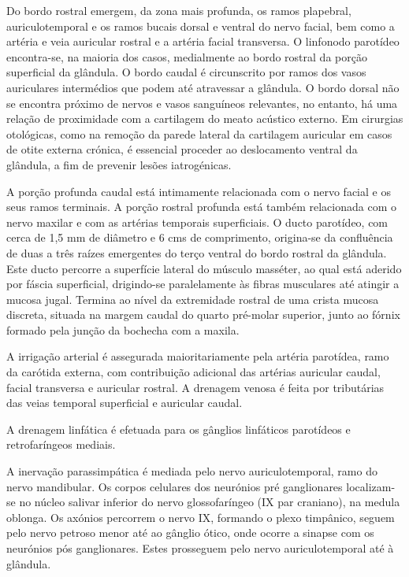 Do bordo rostral emergem, da zona mais profunda, os ramos plapebral, auriculotemporal e os ramos bucais dorsal e ventral do nervo facial, bem como a artéria e veia auricular rostral e a artéria facial transversa.\cite{Singh2017} O linfonodo parotídeo encontra-se, na maioria dos casos, medialmente ao bordo rostral da porção superficial da glândula.\cite{Singh2017} O bordo caudal é circunscrito por ramos dos vasos auriculares intermédios que podem até atravessar a glândula.\cite{Singh2017}
O bordo dorsal não se encontra próximo de nervos e vasos sanguíneos relevantes, no entanto, há uma relação de proximidade com a cartilagem do meato acústico externo.\cite{Singh2017} Em cirurgias otológicas, como na remoção da parede lateral da cartilagem auricular em casos de otite externa crónica, é essencial proceder ao deslocamento ventral da glândula, a fim de prevenir lesões iatrogénicas. \cite{Singh2017}


A porção profunda caudal está intimamente relacionada com o nervo facial e os seus ramos terminais.\cite{Singh2017} A porção rostral profunda está também relacionada com o nervo maxilar e com as artérias temporais superficiais.\cite{Singh2017}
O ducto parotídeo, com cerca de 1,5 mm  de diâmetro e 6 cms de comprimento, origina-se da confluência de duas a três raízes emergentes do terço ventral do bordo rostral da glândula.\cite{Singh2017} Este ducto percorre a superfície lateral do músculo masséter, ao qual está aderido por fáscia superficial, drigindo-se paralelamente às fibras musculares até atingir a mucosa jugal.\cite{Singh2017} Termina ao nível da extremidade rostral de uma crista mucosa discreta, situada na margem caudal do quarto pré-molar superior, junto ao fórnix formado pela junção da bochecha com a maxila.\cite{Singh2017}


A irrigação arterial é assegurada maioritariamente pela artéria parotídea, ramo da carótida externa, com contribuição adicional das artérias auricular caudal, facial transversa e auricular rostral.\cite{Singh2017} A drenagem venosa é feita por tributárias das veias temporal superficial e auricular caudal.\cite{Singh2017}


A drenagem linfática é efetuada para os gânglios linfáticos parotídeos e retrofaríngeos mediais.\cite{Singh2017}


A inervação parassimpática é mediada pelo nervo auriculotemporal, ramo do nervo mandibular.\cite{Singh2017} Os corpos celulares dos neurónios pré ganglionares localizam-se no núcleo salivar inferior do nervo glossofaríngeo (IX par craniano), na medula oblonga.\cite{Singh2017} Os axónios percorrem o nervo IX, formando o plexo timpânico, seguem pelo nervo petroso menor até ao gânglio ótico, onde ocorre a sinapse com os neurónios pós ganglionares. Estes prosseguem pelo nervo auriculotemporal até à glândula.\cite{Singh2017}


